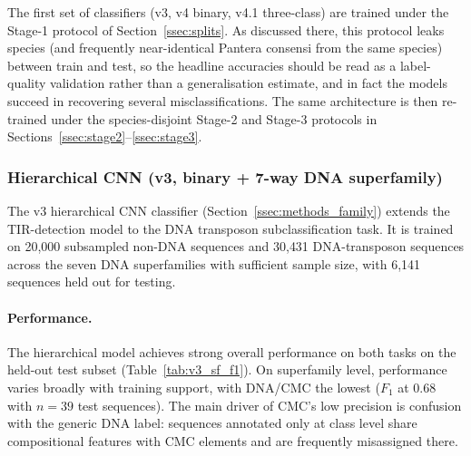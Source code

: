 \documentclass[12pt]{article}
\begin{document}
The first set of classifiers (v3, v4 binary, v4.1 three-class) are trained under the Stage-1 protocol of Section~\ref{ssec:splits}. As discussed there, this protocol leaks species (and frequently near-identical Pantera consensi from the same species) between train and test, so the headline accuracies should be read as a label-quality validation rather than a generalisation estimate, and in fact the models succeed in recovering several misclassifications. The same architecture is then re-trained under the species-disjoint Stage-2 and Stage-3 protocols in Sections~\ref{ssec:stage2}--\ref{ssec:stage3}.

\subsubsection{Hierarchical CNN (v3, binary + 7-way DNA superfamily)}\label{ssec:hier}

The v3 hierarchical CNN classifier (Section~\ref{ssec:methods_family}) extends the TIR-detection model to the DNA transposon subclassification task. It is trained on 20{,}000 subsampled non-DNA sequences and 30{,}431 DNA-transposon sequences across the seven DNA superfamilies with sufficient sample size, with 6{,}141 sequences held out for testing. 

\paragraph{Performance. }

The hierarchical model achieves strong overall performance on both tasks on the held-out test subset (Table~\ref{tab:v3_sf_f1}). On superfamily level, performance varies broadly with training support, with DNA/CMC the lowest ($F_1$ at 0.68 with $n=39$ test sequences). The main driver of CMC's low precision is confusion with the generic DNA label: sequences annotated only at class level share compositional features with CMC elements and are frequently misassigned there. 
\end{document}
